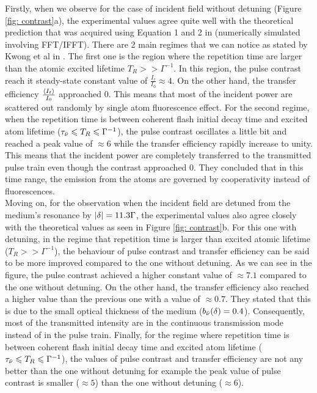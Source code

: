 Firstly, when we observe for the case of incident field without detuning (Figure \ref{fig: contrast}a), the experimental values agree quite well with the theoretical prediction that was acquired using Equation 1 and 2 in \cite{Kwong2015} (numerically simulated involving FFT/IFFT). There are 2 main regimes that we can notice as stated by Kwong et al in \cite{Kwong2015}. The first one is the region where the repetition time are larger than the atomic excited lifetime $T_{R} >> \Gamma^{-1}$. In this region, the pulse contrast reach it steady-state constant value of $\frac{I_{c}}{I_{0}} \approx 4$. On the other hand, the transfer efficiency $\frac{\expval{I_{t}}}{I_{0}}$ approached 0. This means that most of the incident power are scattered out randomly by single atom fluorescence effect. For the second regime, when the repetition time is between coherent flash initial decay time and excited atom lifetime ($\tau_{\Bar{\nu}} \leqslant T_{R} \leqslant \Gamma^{-1}$), the pulse contrast oscillates a little bit and reached a peak value of $\approx 6$ while the transfer efficiency rapidly increase to unity. This means that the incident power are completely transferred to the transmitted pulse train even though the contrast approached 0. They concluded that in this time range, the emission from the atoms are governed by cooperativity instead of fluorescences.\\

Moving on, for the observation when the incident field are detuned from the medium's resonance by $\abs{\delta} = 11.3 \Gamma$, the experimental values also agree closely with the theoretical values as seen in Figure \ref{fig: contrast}b. For this one with detuning, in the regime that repetition time is larger than excited atomic lifetime ($T_{R} >> \Gamma^{-1}$), the behaviour of pulse contrast and transfer efficiency can be said to be more improved compared to the one without detuning. As we can see in the figure, the pulse contrast achieved a higher constant value of $\approx 7.1$ compared to the one without detuning. On the other hand, the transfer efficiency also reached a higher value than the previous one with a value of $\approx 0.7$. They stated that this is due to the small optical thickness of the medium ($b_{\Bar{\nu}}(\delta) = 0.4$). Consequently, most of the transmitted intensity are in the continuous transmission mode instead of in the pulse train. Finally, for the regime where repetition time is between coherent flash initial decay time and excited atom lifetime ($\tau_{\Bar{\nu}} \leqslant T_{R} \leqslant \Gamma^{-1}$), the values of pulse contrast and transfer efficiency are not any better than the one without detuning for example the peak value of pulse contrast is smaller ($\approx 5$) than the one without detuning ($\approx 6$).\\

